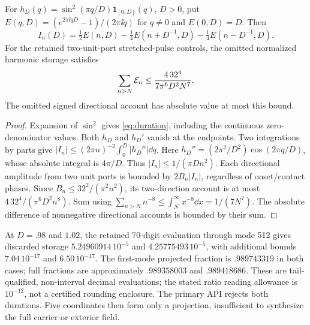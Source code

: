 \begin{proposition}\label{prop:duration}
For $h_D(q)=\sin^2(\pi q/D)\mathbf1_{[0,D]}(q)$, $D>0$, put
$E(q,D)=(e^{2\pi\ii qD}-1)/(2\pi\ii q)$ for $q\ne0$ and $E(0,D)=D$. Then
\begin{equation}\label{eq:duration}
 I_n(D)=\tfrac12 E(n,D)-\tfrac14 E(n+D^{-1},D)-\tfrac14 E(n-D^{-1},D).
\end{equation}
For the retained two-unit-port stretched-pulse controls, the omitted normalized harmonic storage satisfies
\begin{equation}\label{eq:tail}
 \sum_{n>N}\mathcal E_n\le \frac{4\,32^4}{7\pi^6D^2N^7}.
\end{equation}
The omitted signed directional account has absolute value at most this bound.
\end{proposition}
\begin{proof}
Expansion of $\sin^2$ gives \eqref{eq:duration}, including the continuous zero-denominator values. Both $h_D$ and $h_D'$ vanish at the endpoints. Two integrations by parts give
$|I_n|\le(2\pi n)^{-2}\int_0^D|h_D''|\dd q$.
Here $h_D''=(2\pi^2/D^2)\cos(2\pi q/D)$, whose absolute integral is $4\pi/D$. Thus $|I_n|\le1/(\pi Dn^2)$. Each directional amplitude from two unit ports is bounded by $2B_n|I_n|$, regardless of onset/contact phases. Since $B_n\le32^2/(\pi^2n^2)$, its two-direction account is at most $4\,32^4/(\pi^6D^2n^8)$. Sum using $\sum_{n>N}n^{-8}\le\int_N^\infty x^{-8}\dd x=1/(7N^7)$. The absolute difference of nonnegative directional accounts is bounded by their sum.
\end{proof}
At $D=.98$ and $1.02$, the retained 70-digit evaluation through mode 512 gives discarded storage $5.24960914\,10^{-5}$ and $4.25775493\,10^{-5}$, with additional bounds $7.04\,10^{-17}$ and $6.50\,10^{-17}$. The first-mode projected fraction is $.989743319$ in both cases; full fractions are approximately $.989358003$ and $.989418686$. These are tail-qualified, non-interval decimal evaluations; the stated ratio reading allowance is $10^{-12}$, not a certified rounding enclosure. The primary API rejects both durations. Five coordinates then form only a projection, insufficient to synthesize the full carrier or exterior field.
